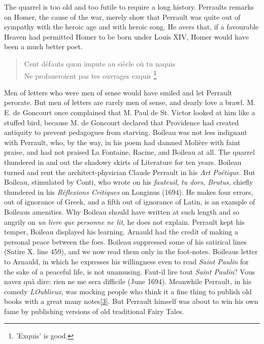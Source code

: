 \documentclass[14pt,a4paper]{memoir}
\begin{document}
The quarrel is too old and too futile to require a long history.
Perrault\textquotesingle s remarks on Homer, the cause of the war,
merely show that Perrault was quite out of sympathy with the heroic age
and with heroic song. He avers that, if a favourable Heaven had
permitted Homer to be born under Louis XIV, Homer would have been a much
better poet.

\begin{verse}
\small
\textquotesingle Cent défauts qu\textquotesingle on impute au siècle où
tu naquis\\
Ne profaneroient pas tes ouvrages exquis
\footnote{'Exquis' is good.}

\end{verse}


Men of letters who were men of sense would have smiled and let Perrault
perorate. But men of letters are rarely men of sense, and dearly love a
brawl. M. E. de Goncourt once complained that M. Paul de St. Victor
looked at him \textquotesingle like a stuffed bird,\textquotesingle{}
because M. de Goncourt declared that Providence had created antiquity to
prevent pedagogues from starving. Boileau was not less indignant with
Perrault, who, by the way, in his poem had damned Molière with faint
praise, and had not praised La Fontaine, Racine, and Boileau at all. The
quarrel \textquotesingle thundered in and out the shadowy
skirts\textquotesingle{} of Literature for ten years. Boileau turned and
rent the architect-physician Claude Perrault in his \emph{Art Poétique}.
But Boileau, stimulated by Conti, who wrote on his \emph{fauteuil},
\textquotesingle{}\emph{tu dors, Brutus,}\textquotesingle{} chiefly
thundered in his \emph{Réflexions Critiques} on Longinus (1694).
\textquotesingle He makes four errors, out of ignorance of Greek, and a
fifth out of ignorance of Latin,\textquotesingle{} is an example of
Boileau\textquotesingle s amenities. Why Boileau should have written at
such length and so angrily on \emph{un livre que personne ne lit}, he
does not explain. Perrault kept his temper, Boileau displayed his
learning. Arnauld had the credit of making a personal peace between the
foes. Boileau suppressed some of his satirical lines (Satire X. line
459), and we now read them only in the foot-notes.
Boileau\textquotesingle s letter to Arnauld, in which he expresses his
willingness even to read \emph{Saint Paulin} for the sake of a peaceful
life, is not unamusing. \textquotesingle Faut-il lire tout \emph{Saint
Paulin}? Vous n\textquotesingle avez qu\textquotesingle à dire: rien ne
me sera difficile\textquotesingle{} (June 1694). Meanwhile Perrault, in
his comedy \emph{L\textquotesingle Oublieux}, was mocking people who
think it a fine thing \textquotesingle to publish old books with a great
many
notes\protect\hypertarget{4533318093929944247_33931-h-0.htm.xhtmlux5cux23FNanchor_3}{}{}\protect\hyperlink{4533318093929944247_33931-h-0.htm.xhtmlux5cux23Footnote_3}{{[}3{]}}.\textquotesingle{}
But Perrault himself was about to win his own fame by publishing
versions of old traditional Fairy Tales.
\end{document}
